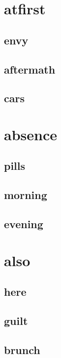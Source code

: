 \documentclass{article}
\begin{document}
\setlength{\parindent}{0.0cm}
\small

\section{atfirst}
\subsection{envy}

\clearpage
\subsection{aftermath}

\clearpage
\subsection{cars}

\clearpage

\section{absence}
\subsection{pills}

\clearpage
\subsection{morning}

\clearpage
\subsection{evening}

\clearpage

\section{also}
\subsection{here}

\clearpage
\subsection{guilt}

\clearpage
\subsection{brunch}

\clearpage
\end{document}
